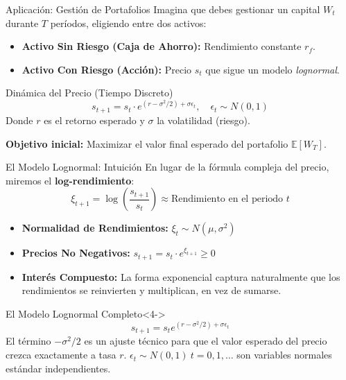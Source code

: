 \documentclass[xcolor=dvipsnames]{beamer}
\begin{document}
\begin{frame}{Aplicaci\'on: Gesti\'on de Portafolios}
Imagina que debes gestionar un capital $W_t$ durante $T$ per\'iodos, eligiendo entre dos activos:
\begin{itemize}
    \item \textbf{Activo Sin Riesgo (Caja de Ahorro):} Rendimiento constante $r_f$.
    \item \textbf{Activo Con Riesgo (Acci\'on):} Precio $s_t$ que sigue un modelo \textit{lognormal}.
\end{itemize}

\begin{block}{Din\'amica del Precio (Tiempo Discreto)}
\[ s_{t+1} = s_t \cdot e^{(r - \sigma^2/2) + \sigma \epsilon_t}, \quad \epsilon_t \sim N(0,1) \]
\small Donde $r$ es el retorno esperado y $\sigma$ la volatilidad (riesgo).
\end{block}

\textbf{Objetivo inicial:} Maximizar el valor final esperado del portafolio $\mathbb{E}[W_T]$.
\end{frame}

\begin{frame}{El Modelo Lognormal: Intuici\'on}
En lugar de la f\'ormula compleja del precio, miremos el \textbf{log-rendimiento}:
\[ \xi_{t+1} = \log\left(\frac{s_{t+1}}{s_t}\right) \approx \text{Rendimiento en el periodo } t \]

\begin{itemize}
    \item \textbf{Normalidad de Rendimientos:} $\xi_t \sim N(\mu, \sigma^2)$
    
    \item<2-> \textbf{Precios No Negativos:}   $s_{t+1} = s_t \cdot e^{\xi_{t+1}}  \geq 0$

    \item<3-> \textbf{Inter\'es Compuesto:} La forma exponencial captura naturalmente que los rendimientos se reinvierten y multiplican, en vez de sumarse. 
\end{itemize}

\begin{block}{El Modelo Lognormal Completo}<4->
\[ s_{t+1} = s_t e^{ (r - \sigma^2/2) + \sigma  \epsilon_t}  \]
\small El t\'ermino $-\sigma^2/2$ es un ajuste t\'ecnico para que el valor esperado del precio crezca exactamente a tasa $r$. $\epsilon_t\sim N(0,1)~t=0,1,\dots$ son variables normales est\'andar independientes.
\end{block}
\end{frame}
\end{document}
